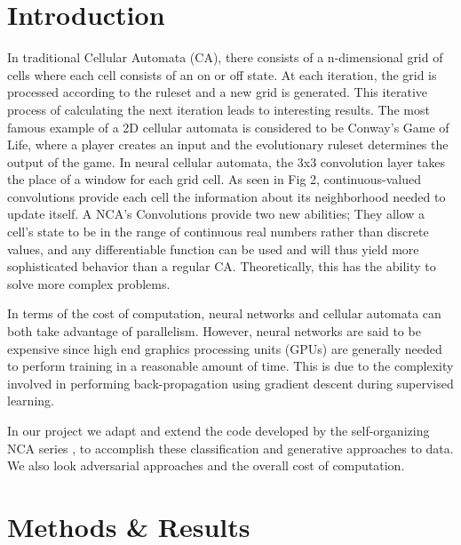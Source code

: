 \documentclass[conference]{IEEEtran}
\begin{document}
\section{Introduction}

In traditional Cellular Automata (CA), there consists of a n-dimensional grid of cells where each cell consists of an on or off state. At each iteration, the grid is processed according to the ruleset and a new grid is generated. This iterative process of calculating the next iteration leads to interesting results. The most famous example of a 2D cellular automata is considered to be Conway's Game of Life, where a player creates an input and the evolutionary ruleset determines the output of the game. In neural cellular automata, the 3x3 convolution layer takes the place of a window for each grid cell. As seen in Fig 2, continuous-valued convolutions provide each cell the information about its neighborhood needed to update itself. A NCA's Convolutions provide two new abilities; They allow a cell's state to be in the range of continuous real numbers rather than discrete values, and any differentiable function can be used and will thus yield more sophisticated behavior than a regular CA. Theoretically, this has the ability to solve more complex problems. 

In terms of the cost of computation, neural networks and cellular automata can both take advantage of parallelism. However, neural networks are said to be expensive since high end graphics processing units (GPUs) are generally needed to perform training in a reasonable amount of time. This is due to the complexity involved in performing back-propagation using gradient descent during supervised learning.

In our project we adapt and extend the code developed by the self-organizing NCA series \cite{selforg}, to accomplish these classification and generative approaches to data. We also look adversarial approaches and the overall cost of computation.



\section{Methods & Results}
\end{document}
